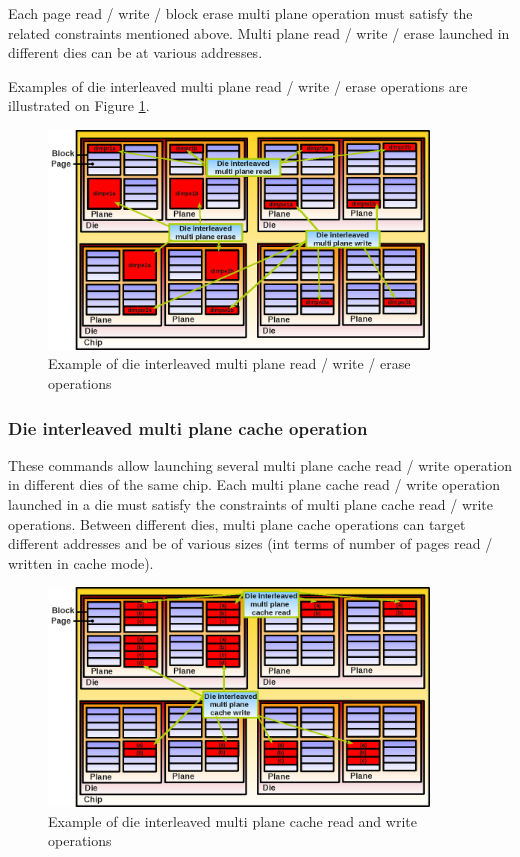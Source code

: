 Each page read / write / block erase multi plane operation must satisfy the related constraints mentioned above. Multi plane read / write / erase launched in different dies can be at various addresses.

Examples of die interleaved multi plane read / write / erase operations are illustrated on Figure \ref{fig:dieinterleavedmultiplaneop}.

\begin{figure}
  \center
  \includegraphics[width=0.9\textwidth]{Includes/DieInterleavedMultiPlaneOp.png}
  \caption{Example of die interleaved multi plane read / write / erase operations}
  \label{fig:dieinterleavedmultiplaneop}
\end{figure}

\subsubsection{Die interleaved multi plane cache operation}
These commands allow launching several multi plane cache read / write operation in different dies of the same chip. Each multi plane cache read / write operation launched in a die must satisfy the constraints of multi plane cache read / write operations. Between different dies, multi plane cache operations can target different addresses and be of various sizes (int terms of number of pages read / written in cache mode).

\begin{figure}
  \center
  \includegraphics[width=0.9\textwidth]{Includes/DieInterleavedMultiPlaneCacheOp.png}
  \caption{Example of die interleaved multi plane cache read and write operations}
  \label{fig:dieinterleavedmultiplanecacheop}
\end{figure}

